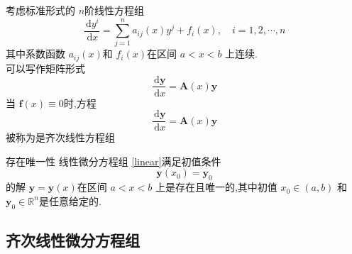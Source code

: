 \documentclass[lang=cn,12pt,color=green,fontset=none]{elegantbook}
\begin{document}
\begin{definition}
    考虑标准形式的 $ n $阶线性方程组 
    \begin{equation}\label{linear}
        \frac{\,\mathrm{d} y^{i} }{\,\mathrm{d} x } =  \sum_{j=1}^{n}a_{ij}\left( x \right)y^{j}+  f_{i}\left( x \right),\quad i = 1,2,\cdots ,n   
    \end{equation}
 其中系数函数 $ a_{ij}\left( x \right)  $和 $ f_{i}\left( x \right)  $在区间 $ a<x<b $   上连续.\\ 
     可以写作矩阵形式 \begin{equation}
        \frac{\,\mathrm{d} \mathbf{y} }{ \,\mathrm{d} x} = \mathbf{A}\left( x \right)\mathbf{y}  
     \end{equation}\label{homo-linear}
     当 $ \mathbf{f}\left( x \right) \equiv 0  $时,方程 \begin{equation}
        \frac{\,\mathrm{d} \mathbf{y} }{\,\mathrm{d} x } = \mathbf{A}\left( x \right) \mathbf{y}
     \end{equation}被称为是齐次线性方程组 
\end{definition}
\begin{theorem}{存在唯一性}
    线性微分方程组 \eqref{linear}满足初值条件 \begin{equation}
        \mathbf{y}\left( x_0 \right)= \mathbf{y}_{0} 
    \end{equation}的解 $ \mathbf{y}=\mathbf{y}\left( x \right)  $在区间 $ a<x<b $  上是存在且唯一的,其中初值 $ x_0\in \left( a,b \right)  $ 和 $ \mathbf{y}_{0} \in \mathbb{R} ^{n} $是任意给定的. 
\end{theorem}





\subsection{齐次线性微分方程组}
\end{document}

